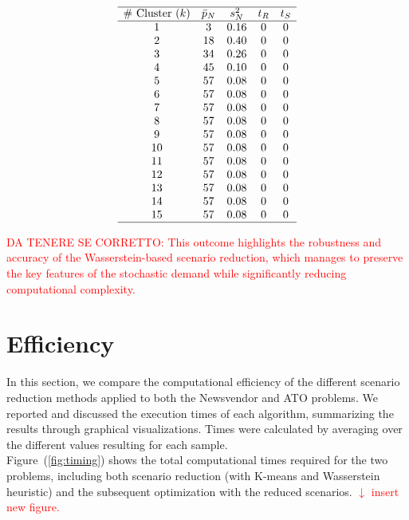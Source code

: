 \documentclass[a4paper,12pt]{article}
\begin{document}
	\[
	\begin{array}{ccccc}
		\hline
		\text{\# Cluster $(k)$} & \text{$\bar{p}_{N}$} & \text{$s_{N}^{2}$} & \text{$t_{R}$} & \text{$t_{S}$}\\
		\hline
		1 & 3 & 0.16 & 0 & 0\\
		2 & 18 & 0.40 & 0 & 0\\
		3 & 34 & 0.26 & 0 & 0\\
		4 & 45 & 0.10 & 0 & 0\\
		5 & 57 & 0.08 & 0 & 0\\
		6 & 57 & 0.08 & 0 & 0\\
		7 & 57 & 0.08 & 0 & 0\\
		8 & 57 & 0.08 & 0 & 0\\
		9 & 57 & 0.08 & 0 & 0\\
		10 & 57 & 0.08 & 0 & 0\\
		11 & 57 & 0.08 & 0 & 0\\
		12 & 57& 0.08 & 0 & 0\\
		13 & 57 & 0.08 & 0 & 0\\
		14 & 57 & 0.08 & 0 & 0\\
		15 & 57 & 0.08 & 0 & 0\\
		\hline
	\end{array}
	\]
	
	\label{tab:wass-ato-results}
	
	
	\textcolor{red}{DA TENERE SE CORRETTO: This outcome highlights the robustness and accuracy of the Wasserstein-based scenario reduction, which manages to preserve the key features of the stochastic demand while significantly reducing computational complexity.
	}
	
	\newpage	
	\section{Efficiency}
	
	In this section, we compare the computational efficiency of the different scenario reduction methods applied to both the Newsvendor and ATO problems. We reported and discussed the execution times of each algorithm, summarizing the results through graphical visualizations. Times were calculated by averaging over the different values resulting for each sample.\\
	
	\noindent Figure~(\ref{fig:timing}) shows the total computational times required for the two problems, including both scenario reduction (with K-means and Wasserstein heuristic) and the subsequent optimization with the reduced scenarios. \textcolor{red}{$\downarrow$ insert new figure.}
	
\end{document}
